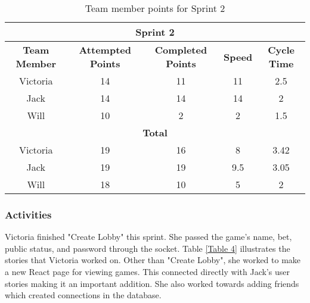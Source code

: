 \begin{table}[h]
\begin{tabular}{|ccccc|}
\hline
\multicolumn{5}{|c|}{\textbf{Sprint 2}}                                                                                                                                                                  \\ \hline
\multicolumn{1}{|c|}{\textbf{Team Member}} & \multicolumn{1}{c|}{\textbf{Attempted Points}} & \multicolumn{1}{c|}{\textbf{Completed Points}} & \multicolumn{1}{c|}{\textbf{Speed}} & \textbf{Cycle Time} \\ \hline
\multicolumn{1}{|c|}{Victoria}             & \multicolumn{1}{c|}{14}                        & \multicolumn{1}{c|}{11}                        & \multicolumn{1}{c|}{11}             & 2.5                 \\ \hline
\multicolumn{1}{|c|}{Jack}                 & \multicolumn{1}{c|}{14}                        & \multicolumn{1}{c|}{14}                        & \multicolumn{1}{c|}{14}             & 2                   \\ \hline
\multicolumn{1}{|c|}{Will}                 & \multicolumn{1}{c|}{10}                        & \multicolumn{1}{c|}{2}                         & \multicolumn{1}{c|}{2}              & 1.5                 \\ \hline
\multicolumn{5}{|c|}{\textbf{Total}}                                                                                                                                                                     \\ \hline
\multicolumn{1}{|c|}{Victoria}             & \multicolumn{1}{c|}{19}                        & \multicolumn{1}{c|}{16}                        & \multicolumn{1}{c|}{8}              & 3.42                \\ \hline
\multicolumn{1}{|c|}{Jack}                 & \multicolumn{1}{c|}{19}                        & \multicolumn{1}{c|}{19}                        & \multicolumn{1}{c|}{9.5}            & 3.05                \\ \hline
\multicolumn{1}{|c|}{Will}                 & \multicolumn{1}{c|}{18}                        & \multicolumn{1}{c|}{10}                        & \multicolumn{1}{c|}{5}              & 2                   \\ \hline
\end{tabular}
\caption{Team member points for Sprint 2}
\label{Table 5}
\end{table}

\subsubsection{Activities}
Victoria finished "Create Lobby" this sprint. She passed the game's name, bet, public status, and password through the socket. Table \ref{Table 4} illustrates the stories that Victoria worked on. Other than "Create Lobby", she worked to make a new React page for viewing games. This connected directly with Jack's user stories making it an important addition. She also worked towards adding friends which created connections in the database.

